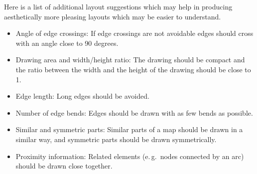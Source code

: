 Here is a list of additional layout suggestions which may help in producing aesthetically more pleasing layouts which may be easier to understand.

\begin{itemize}
  \item Angle of edge crossings: If edge crossings are not avoidable edges should cross with an angle close to 90 degrees.
  \item Drawing area and width/height ratio: The drawing should be compact and the ratio between the width and the height of the drawing should be close to 1.
  \item Edge length: Long edges should be avoided.
  \item Number of edge bends: Edges should be drawn with as few bends as possible.
  \item Similar and symmetric parts: Similar parts of a map should be drawn in a similar way, and symmetric parts should be drawn symmetrically.
  \item Proximity information: Related elements (e.\,g.~nodes connected by an arc) should be drawn close together.
\end{itemize} 

